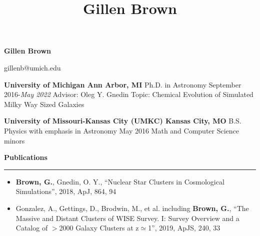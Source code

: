 \documentclass[10pt]{article}
\title{Gillen Brown}
\newcommand{\header}[1]{\vspace{2em}\par \textbf{\large #1}\strut\hrule\vspace{0em}}
\newcommand{\actionHeader}[2]{\textbf{#1 \hfill #2}}
\newcommand{\indentedItemDate}[2]{\newline\null\qquad #1 \hfill #2}
\newcommand{\indentedItem}[1]{\newline\null\qquad #1}
\begin{document}
\thispagestyle{empty}


\begin{center}
{\huge \bf Gillen Brown}

{\Large gillenb@umich.edu}
\end{center}
\bigskip



\actionHeader{University of Michigan}{Ann Arbor, MI}
\indentedItemDate{Ph.D. in Astronomy}{September 2016-{\it May 2022}}
\indentedItem{Advisor: Oleg Y. Gnedin} 
\indentedItem{Topic: Chemical Evolution of Simulated Milky Way Sized Galaxies}

\actionHeader{University of Missouri-Kansas City (UMKC)}{Kansas City, MO}
\indentedItemDate{B.S. Physics with emphasis in Astronomy}{May 2016}
\indentedItem{Math and Computer Science minors}

\header{Publications}
\begin{itemize}
    \item \textbf{Brown, G.}, Gnedin, O. Y.,  ``Nuclear Star Clusters in Cosmological Simulations'', 2018, ApJ, 864, 94
    \item Gonzalez, A., Gettings, D., Brodwin, M., et al. including \textbf{Brown, G.}, ``The Massive and Distant Clusters of WISE Survey. I: Survey Overview and a Catalog of $>$2000 Galaxy Clusters at z$\simeq$1'', 2019, ApJS, 240, 33
\end{itemize}
\end{document}
